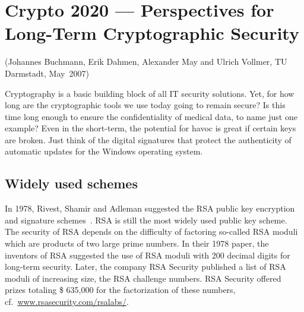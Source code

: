 
\newpage
\hypertarget{Chapter_Crypto2020}{}
\chapter{Crypto 2020 --- Perspectives for Long-Term Cryptographic
         Security}
\label{Chapter_Crypto2020}
\begin{sloppypar}
(Johannes Buchmann, Erik Dahmen, Alexander May and Ulrich Vollmer, TU Darmstadt, May~2007)\\
\end{sloppypar}


Cryptography is a basic building block of all IT
security solutions.  Yet, for how long are the
cryptographic tools we use today going to remain
secure?  Is this time long enough to ensure the
confidentiality of medical data, to name just one
example?  Even in the short-term, the potential
for havoc is great if certain keys are broken.
Just think of the digital signatures that protect
the authenticity of automatic updates for the
Windows operating system.


\section{Widely used schemes}
\label{sec:the-weak}

In 1978, Rivest, Shamir and Adleman suggested the
RSA public key encryption and signature
schemes~\cite{rivest/shamir/adleman:1978}.  RSA is
still the most widely used public key scheme.  The
security of RSA depends on the difficulty of
factoring so-called RSA moduli which are products
of two large prime numbers.  In their 1978 paper,
the inventors of RSA suggested the use of RSA
moduli with 200 decimal digits for long-term
security.  Later, the company RSA Security
published a list of RSA moduli of increasing size,
the RSA challenge numbers.  RSA Security offered
prizes totaling \$ 635,000 for the factorization
of these numbers, cf.\
\url{www.rsasecurity.com/rsalabs/}.

